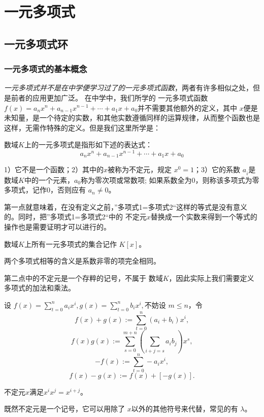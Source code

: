 \chapter{一元多项式}
\section{一元多项式环}
\subsection{一元多项式的基本概念}
\emph{一元多项式并不是在中学便学习过了的一元多项式函数}，两者有许多相似之处，但是前者的应用更加广泛。
在中学中，我们所学的 一元多项式函数$f(x)=a_nx^n+a_{n-1}x^{n-1}+\cdots+a_1x+a_0$并不需要其他额外的定义，其中 $x$便是
未知量，是一个待定的实数，和其他实数遵循同样的运算规律，从而整个函数也是这样，无需作特殊的定义。但是我们这里所学是：
\begin{mydef}[一元多项式]
   数域$K$上的一元多项式是指形如下述的表达式： 
\[a_nx^n+a_{n-1}x^{n-1}+\cdots+a_1x+a_0\]
\end{mydef}
1）它不是一个函数；2）其中的$x$被称为不定元，规定 $x^0=1$；3）它的系数 $a_{i}^{}$是 数域$K$中的一个元素，$a_0$称为零次项或常数项;
如果系数全为0，则称该多项式为零多项式，记作0，否则应有 $a_n\neq 0$。

第一点就意味着，在没有定义之前，”多项式1=多项式2“这样的等式是没有意义的。同时，把”多项式1=多项式2“中的
不定元$x$替换成一个实数来得到一个等式的操作也是需要证明才可以进行的。
\begin{myrmk}
    数域$K$上所有一元多项式的集合记作 $K[x]$。
\end{myrmk}
\begin{mydef}
    两个多项式相等的含义是系数非零的项完全相同。
\end{mydef}

第二点中的不定元是一个存粹的记号，不属于 数域$K$，因此实际上我们需要定义多项式的加法和乘法。
\begin{mydef}
    设 $f(x)=\sum_{t=0}^na_ix^i,g(x)=\sum_{t=0}^nb_ix^i,$不妨设 $m\leq n$，令
    \[f(x)+g(x):=\sum_{t=0}^n(a_i+b_i)x^i,\]
    \[f(x)g(x):=\sum_{s=0}^{m+n}(\sum_{i+j=s}^{}a_ib_j)x^s,\]
    \[-f(x):=\sum_{t=0}^n-a_ix^i,\]
    \[f(x)-g(x):=f(x)+[-g(x)].\]
\end{mydef}
\begin{myrmk}
    不定元$x$满足$x^ix^j=x^{i+j}$。

    既然不定元是一个记号，它可以用除了 $x$以外的其他符号来代替，常见的有 $\lambda$。
\end{myrmk}

